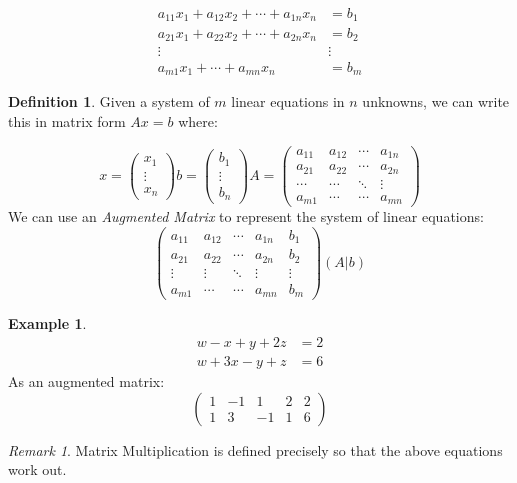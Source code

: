 \documentclass{report}
\theoremstyle{remark}
\newtheorem{remark}[theorem]{Remark}
\theoremstyle{definition}
\newtheorem{definition}[theorem]{Definition}
\theoremstyle{definition}
\newtheorem{example}[theorem]{Example}
\theoremstyle{theorem}
\begin{document}
\[\begin{split}
a_{11} x_1 + a_{12} x_2+\cdots+a_{1n}x_n&= b_1\\
a_{21}x_1+a_{22}x_2+\cdots+a_{2n}x_n&= b_2\\
\vdots & \vdots \\
a_{m1}x_1+\cdots+a_{mn}x_n&= b_m
\end{split}\]
\begin{definition}
Given a system of $m$ linear equations in $n$ unknowns, we can write this in matrix form $Ax=b$ where:
\end{definition}
\[
x=\begin{pmatrix}
x_1\\
\vdots \\
x_n
\end{pmatrix} b = \begin{pmatrix}
b_1\\
\vdots \\
b_n
\end{pmatrix}
A = \begin{pmatrix}
a_{11} & a_{12} & \cdots & a_{1n} \\
a_{21} & a_{22} & \cdots & a_{2n} \\
\cdots & \cdots & \ddots & \vdots \\
 a_{m1} & \cdots & \cdots & a_{mn}
\end{pmatrix}
\]
We can use an \emph{Augmented Matrix} to represent the system of linear equations:
\[
\left(
\begin{array}{rrrr|r}
a_{11} & a_{12} & \cdots & a_{1n} & b_1 \\
a_{21} & a_{22} & \cdots & a_{2n} & b_2 \\
\vdots & \vdots & \ddots & \vdots & \vdots \\
a_{m1} & \cdots & \cdots & a_{mn} & b_m
\end{array}
\right)
(A | b)
\]
\begin{example}
\[
\begin{split}
w-x+y+2z &=2\\
w+3x-y+z&=6
\end{split}
\]
As an augmented matrix:
\[
\left(
\begin{array}{rrrr|r}
1&-1&1&2&2\\
1&3&-1&1&6
\end{array}
\right)
\]
\end{example}
\begin{remark}
Matrix Multiplication is defined precisely so that the above equations work out.
\end{remark}
\end{document}
